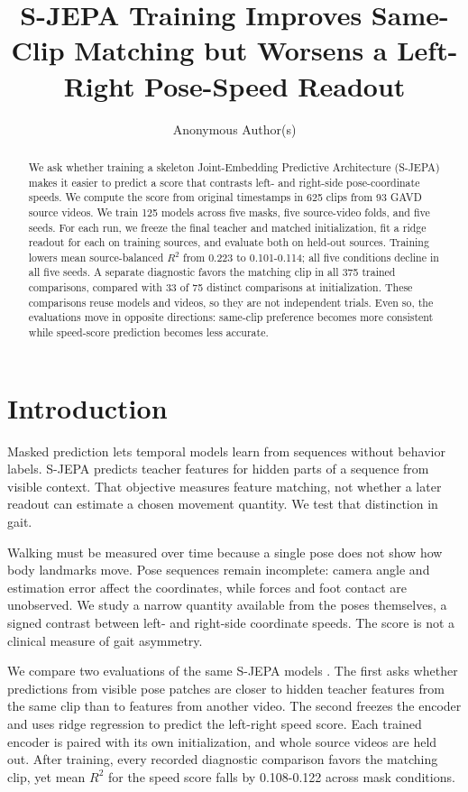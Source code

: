 \documentclass{article}
\title{S-JEPA Training Improves Same-Clip Matching but Worsens a Left-Right Pose-Speed Readout}
\author{Anonymous Author(s)}
\begin{document}
\maketitle
\begin{abstract}
We ask whether training a skeleton Joint-Embedding Predictive
Architecture (S-JEPA) makes it easier to predict a score that contrasts
left- and right-side pose-coordinate speeds. We compute the score from
original timestamps in 625 clips from 93 GAVD source videos. We train
125 models across five masks, five source-video folds, and five seeds.
For each run, we freeze the final teacher and matched initialization,
fit a ridge readout for each on training sources, and evaluate both on
held-out sources. Training lowers mean source-balanced \(R^2\) from
0.223 to 0.101-0.114; all five conditions decline in all five seeds. A
separate diagnostic favors the matching clip in all 375 trained
comparisons, compared with 33 of 75 distinct comparisons at
initialization. These comparisons reuse models and videos, so they are
not independent trials. Even so, the evaluations move in opposite
directions: same-clip preference becomes more consistent while
speed-score prediction becomes less accurate.
\end{abstract}
\section{Introduction}\label{introduction}

Masked prediction lets temporal models learn from sequences without
behavior labels. S-JEPA predicts teacher features for hidden parts of a
sequence from visible context. That objective measures feature matching,
not whether a later readout can estimate a chosen movement quantity. We
test that distinction in gait.

Walking must be measured over time because a single pose does not show
how body landmarks move. Pose sequences remain incomplete: camera angle
and estimation error affect the coordinates, while forces and foot
contact are unobserved. We study a narrow quantity available from the
poses themselves, a signed contrast between left- and right-side
coordinate speeds. The score is not a clinical measure of gait
asymmetry.

We compare two evaluations of the same S-JEPA models \citep{sjepa}. The
first asks whether predictions from visible pose patches are closer to
hidden teacher features from the same clip than to features from another
video. The second freezes the encoder and uses ridge regression to
predict the left-right speed score. Each trained encoder is paired with
its own initialization, and whole source videos are held out. After
training, every recorded diagnostic comparison favors the matching clip,
yet mean \(R^2\) for the speed score falls by 0.108-0.122 across mask
conditions.
\end{document}
